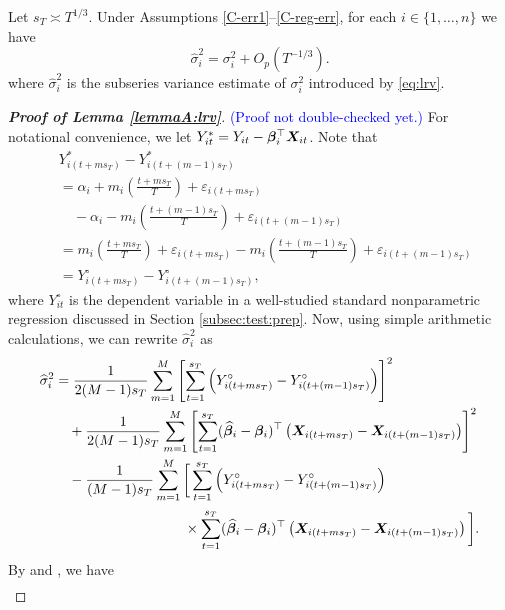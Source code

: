 \begin{lemmaA}\label{lemmaA:lrv}
Let $s_T \asymp T^{1/3}$. Under Assumptions \ref{C-err1}--\ref{C-reg-err}, for each $i \in \{1, \ldots, n\}$ we have
$$\widehat{\sigma}_i^2 = \sigma_i^2 + O_p(T^{-1/3}).$$
where $\widehat{\sigma}_i^2$ is the subseries variance estimate of $\sigma_i^2$ introduced by \eqref{eq:lrv}.
\end{lemmaA}


\begin{proof}[\textnormal{\textbf{Proof of Lemma \ref{lemmaA:lrv}}}]
\textcolor{blue}{(Proof not double-checked yet.)}
For notational convenience, we let $Y_{it}^* = Y_{it} - \bm{\beta}_i^\top \boldsymbol{X}_{it}$. Note that 
\begin{align*}
&Y_{i(t + ms_T)}^* - Y_{i(t + (m-1)s_T)}^* \\
&= \alpha_i + m_i\left(\frac{t+m s_T}{T}\right) + \varepsilon_{i(t + ms_T)} \\
&\quad-  \alpha_i - m_i\left(\frac{t+(m-1) s_T}{T}\right) + \varepsilon_{i(t + (m-1)s_T)} \\
&=m_i\left(\frac{t+m s_T}{T}\right) + \varepsilon_{i(t + ms_T)}  - m_i\left(\frac{t+(m-1) s_T}{T}\right) + \varepsilon_{i(t + (m-1)s_T)}\\
& = Y_{i(t + ms_T)}^\circ - Y_{i(t + (m-1)s_T)}^\circ, 
\end{align*}
where $Y_{it}^\circ$ is the dependent variable in a well-studied standard nonparametric regression discussed in Section \ref{subsec:test:prep}.
Now, using simple arithmetic calculations, we can rewrite $\widehat{\sigma}_i^2$ as
\begin{align}
\widehat{\sigma}_i^2  &= \frac{1}{2(M-1)s_T}\sum_{m=1}^M \left[\sum_{t = 1}^{s_T} \left(Y_{i(t + ms_T)}^\circ - Y_{i(t + (m-1)s_T)}^\circ\right)\right]^2 \nonumber\\
&\quad + \frac{1}{2(M-1)s_T}\sum_{m=1}^M \left[\sum_{t = 1}^{s_T} (\widehat{\bfbeta}_i - \bfbeta_i)^\top\left(\X_{i(t+ms_T)} - \X_{i(t+(m-1)s_T)}\right) \right]^2 \nonumber \\
 &\quad - \frac{1}{(M-1)s_T}\sum_{m=1}^M \bigg[\sum_{t = 1}^{s_T}  \left(Y_{i(t + ms_T)}^\circ - Y_{i(t + (m-1)s_T)}^\circ\right) \nonumber \\ & \phantom{\quad - \frac{1}{(M-1)s_T}\sum_{m=1}^M \bigg[} \times \sum_{t = 1}^{s_T} (\widehat{\bfbeta}_i - \bfbeta_i)^\top\left(\X_{i(t+ms_T)} - \X_{i(t+(m-1)s_T)}\right) \bigg]. \label{eqA:lrv:proof1}
\end{align}
By \cite{Carlstein1986} and \cite{WuZhao2007}, we have
\begin{align}\label{eqA:lrv:proof2}

\end{align}
\end{proof}
